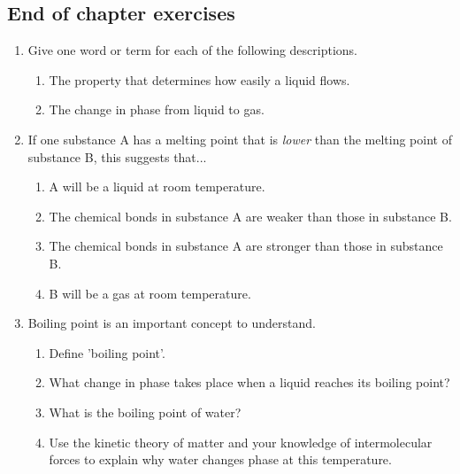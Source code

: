             \subsection{ End of chapter exercises}
            \nopagebreak
\label{m38730*id311490}\begin{enumerate}[noitemsep, label=\textbf{\arabic*}. ] 
            \label{m38730*uid87}\item Give one word or term for each of the following 
descriptions.
\label{m38730*id311506}\begin{enumerate}[noitemsep, label=\textbf{\alph*}. ] 
            \label{m38730*uid88}\item The 
property that determines how easily a liquid flows.
\label{m38730*uid89}\item The change in phase from liquid to gas.
\end{enumerate}
\label{m38730*uid92}\item If one substance A has a melting point that is \textsl{lower} than the melting point of substance B, this 
suggests that...
\label{m38730*id311675}\begin{enumerate}[noitemsep, label=\textbf{\alph*}. ] 
            \label{m38730*uid99}\item A 
will be a liquid at room temperature.
\label{m38730*uid100}\item The chemical bonds in substance A are weaker than those 
in substance B.
\label{m38730*uid101}\item The chemical bonds in substance A are stronger than 
those in substance B.
\label{m38730*uid102}\item B will be a gas at room temperature.
\end{enumerate}
                \label{m38730*uid103}\item Boiling point is an important concept to understand.
\label{m38730*id311744}\begin{enumerate}[noitemsep, label=\textbf{\alph*}. ] 
            \label{m38730*uid104}\item Define 'boiling point'.
\label{m38730*uid105}\item What change in phase takes place when a liquid reaches 
its boiling point?
\label{m38730*uid106}\item What is the boiling point of water?
\label{m38730*uid107}\item Use the kinetic theory of matter and your knowledge of 
intermolecular forces to explain why water changes phase at this temperature.
\end{enumerate}

\end{enumerate}
